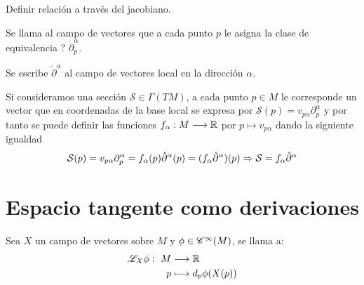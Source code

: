 \begin{exercise}
  Definir relación a través del jacobiano.
\end{exercise}

\begin{definition}
  Se llama  al campo de
  vectores que a cada punto $p$ le asigna la clase de equivalencia ? $\mathring{\partial}_p^\alpha$.
\end{definition}
\begin{notation}
  Se escribe $\mathring{\partial}^\alpha$ al campo de vectores local en la dirección $\alpha$.
\end{notation}

Si consideramos una sección $\mathcal{S}\in\Gamma(TM)$, a cada punto $p\in M$ le corresponde un vector que en
coordenadas de la base local se expresa por $\mathcal{S}(p)=v_{p\alpha}\partial_p^\alpha$ y por tanto se puede definir
las funciones $f_\alpha:M\longrightarrow \mathbb{R}$ por $p\mapsto v_{p\alpha}$ dando la siguiente igualdad
\begin{equation}\label{eq:seccion-coordenadas-locales}
\mathcal{S}(p)=v_{p\alpha}\partial_p^\alpha=f_\alpha(p)\mathring{\partial}^\alpha(p)=(f_\alpha\mathring{\partial}^\alpha)(p)
  \Rightarrow
\mathcal{S}=f_\alpha\mathring{\partial}^\alpha
\end{equation}

\section{Espacio tangente como derivaciones}\label{sec:espacio-tangente-como-derivaciones}

\begin{definition}
  Sea $X$ un campo de vectores sobre $M$ y $\phi\in\mathscr{C}^\infty(M)$, se llama  a:
  \begin{equation}
    \label{eq:derivada-lie-funcion-campo}
    \begin{alignedat}{1}
      \mathscr{L}_X \phi:\ M & \longrightarrow \mathbb{R} \\ p & \longmapsto d_p \phi(X(p))
    \end{alignedat}
  \end{equation}
\end{definition}

